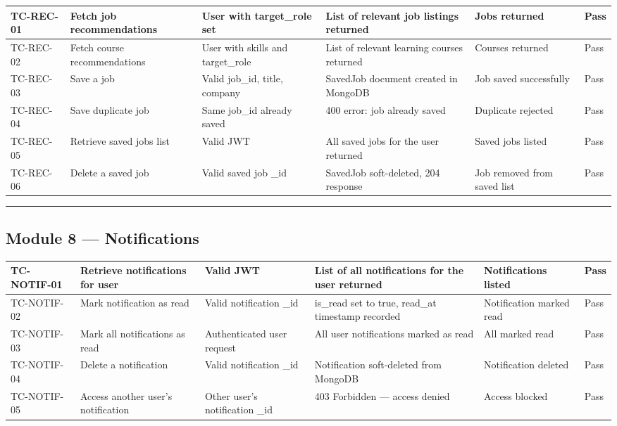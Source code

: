 \documentclass[12pt]{article}
\begin{document}
\begin{longtable}{|p{}|p{}|p{}|p{}|p{}|p{}|}
\hline
\textbf{TC-REC-01} & \textbf{Fetch job recommendations} & \textbf{User with target\_role set} & \textbf{List of relevant job listings returned} & \textbf{Jobs returned} & \textbf{Pass} \\ \hline
\endhead
TC-REC-02 & Fetch course recommendations & User with skills and target\_role & List of relevant learning courses returned & Courses returned & Pass \\ \hline
TC-REC-03 & Save a job & Valid job\_id, title, company & SavedJob document created in MongoDB & Job saved successfully & Pass \\ \hline
TC-REC-04 & Save duplicate job & Same job\_id already saved & 400 error: job already saved & Duplicate rejected & Pass \\ \hline
TC-REC-05 & Retrieve saved jobs list & Valid JWT & All saved jobs for the user returned & Saved jobs listed & Pass \\ \hline
TC-REC-06 & Delete a saved job & Valid saved job \_id & SavedJob soft-deleted, 204 response & Job removed from saved list & Pass \\ \hline
\end{longtable}



\noindent\rule{\textwidth}{0.4pt}

\subsection{Module 8 — Notifications}


\begin{longtable}{|p{}|p{}|p{}|p{}|p{}|p{}|}
\hline
\textbf{TC-NOTIF-01} & \textbf{Retrieve notifications for user} & \textbf{Valid JWT} & \textbf{List of all notifications for the user returned} & \textbf{Notifications listed} & \textbf{Pass} \\ \hline
\endhead
TC-NOTIF-02 & Mark notification as read & Valid notification \_id & is\_read set to true, read\_at timestamp recorded & Notification marked read & Pass \\ \hline
TC-NOTIF-03 & Mark all notifications as read & Authenticated user request & All user notifications marked as read & All marked read & Pass \\ \hline
TC-NOTIF-04 & Delete a notification & Valid notification \_id & Notification soft-deleted from MongoDB & Notification deleted & Pass \\ \hline
TC-NOTIF-05 & Access another user's notification & Other user's notification \_id & 403 Forbidden — access denied & Access blocked & Pass \\ \hline
\end{longtable}
\end{document}

